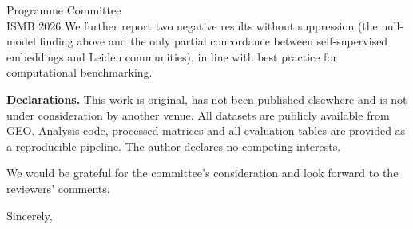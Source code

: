 \documentclass[11pt]{letter}
\begin{document}
\begin{letter}{Programme Committee \\ ISMB 2026}
We further report two negative results without suppression (the null-model finding above and
the only partial concordance between self-supervised embeddings and Leiden communities), in
line with best practice for computational benchmarking.

\vspace{6pt}
\noindent\textbf{Declarations.} This work is original, has not been published elsewhere and
is not under consideration by another venue. All datasets are publicly available from GEO.
Analysis code, processed matrices and all evaluation tables are provided as a reproducible
pipeline. The author declares no competing interests.

\vspace{8pt}
\noindent We would be grateful for the committee's consideration and look forward to the
reviewers' comments.

\closing{Sincerely,}

\end{letter}
\end{document}
